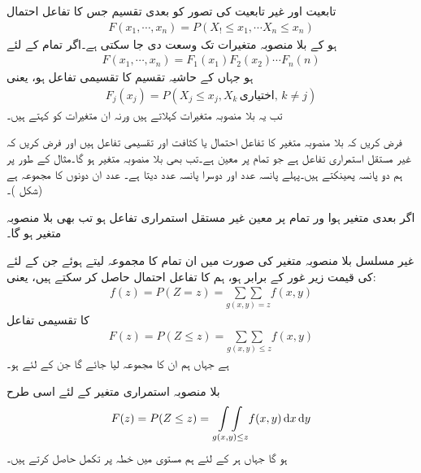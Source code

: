 تابعیت اور غیر تابعیت کی تصور کو  بعدی تقسیم  جس کا تفاعل احتمال
\begin{align*}
F(x_1,\cdots,x_n)=P(X_!\le x_1,\cdots X_n\le x_n)
\end{align*}
ہو کے  بلا منصوبہ متغیرات  تک وسعت دی جا سکتی ہے۔اگر تمام  کے لئے
\begin{align}
F(x_1,\cdots,x_n)=F_1(x_1)F_2(x_2)\cdots F_n(n)
\end{align}
ہو جہاں  کے حاشیہ تقسیم کا تقسیمی تفاعل  ہو، یعنی
\begin{align*}
F_j(x_j)=P(X_j\le x_j, X_k\, \text{اختیاری},\, k\ne j)
\end{align*}
تب یہ بلا منصوبہ متغیرات  کہلاتے ہیں ورنہ  ان متغیرات کو  کہتے ہیں۔

فرض کریں کہ بلا منصوبہ متغیر  کا تفاعل احتمال یا کثافت  اور تقسیمی تفاعل  ہیں اور فرض کریں کہ  غیر مستقل استمراری تفاعل ہے جو تمام  پر معین ہے۔تب  بھی بلا منصوبہ متغیر ہو گا۔مثال کے طور پر ہم دو پانسہ پھینکتے ہیں۔پہلے پانسہ عدد  اور دوسرا پانسہ عدد  دیتا ہے۔ عدد  ان دونوں کا مجموعہ ہے (شکل )۔

اگر  بعدی متغیر ہوا ور تمام  پر   معین غیر مستقل استمراری تفاعل ہو  تب  بھی بلا منصوبہ متغیر ہو گا۔

غیر مسلسل بلا منصوبہ متغیر  کی صورت میں ان تمام  کا مجموعہ لیتے ہوئے جن کے لئے  کی قیمت زیر غور  کے برابر ہو،  ہم  کا تفاعل احتمال  حاصل کر سکتے ہیں، یعنی:
\begin{align}
f(z)=P(Z=z)=\underset{g(x,y)=z}{\sum\sum} f(x,y)
\end{align}
 کا تقسیمی تفاعل
\begin{align}
F(z)=P(Z\le z)=\underset{g(x,y)\le z}{\sum\sum} f(x,y)
\end{align}
ہے جہاں ہم ان  کا مجموعہ لیا جائے گا جن کے لئے  ہو۔

بلا منصوبہ استمراری متغیر  کے لئے اسی طرح
\begin{align}
F(z)=P(Z\le z) =\underset{g(x,y)\le z}{\int\int} f(x,y)\dif x\dif y
\end{align}
ہو گا جہاں ہر  کے لئے ہم  مستوی میں خطہ  پر تکمل حاصل کرتے ہیں۔

